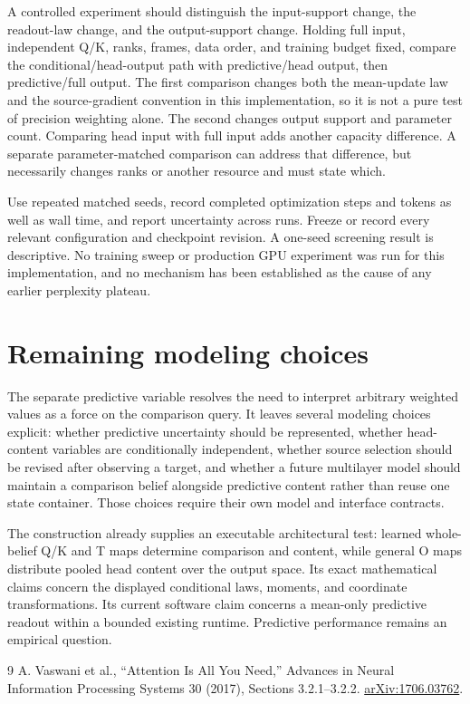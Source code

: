 \documentclass[11pt,letterpaper]{article}
\begin{document}
A controlled experiment should distinguish the input-support change, the readout-law change, and the output-support change. Holding full input, independent Q/K, ranks, frames, data order, and training budget fixed, compare the conditional/head-output path with predictive/head output, then predictive/full output. The first comparison changes both the mean-update law and the source-gradient convention in this implementation, so it is not a pure test of precision weighting alone. The second changes output support and parameter count. Comparing head input with full input adds another capacity difference. A separate parameter-matched comparison can address that difference, but necessarily changes ranks or another resource and must state which.

Use repeated matched seeds, record completed optimization steps and tokens as well as wall time, and report uncertainty across runs. Freeze or record every relevant configuration and checkpoint revision. A one-seed screening result is descriptive. No training sweep or production GPU experiment was run for this implementation, and no mechanism has been established as the cause of any earlier perplexity plateau.

\section{Remaining modeling choices}
The separate predictive variable resolves the need to interpret arbitrary weighted values as a force on the comparison query. It leaves several modeling choices explicit: whether predictive uncertainty should be represented, whether head-content variables are conditionally independent, whether source selection should be revised after observing a target, and whether a future multilayer model should maintain a comparison belief alongside predictive content rather than reuse one state container. Those choices require their own model and interface contracts.

The construction already supplies an executable architectural test: learned whole-belief Q/K and T maps determine comparison and content, while general O maps distribute pooled head content over the output space. Its exact mathematical claims concern the displayed conditional laws, moments, and coordinate transformations. Its current software claim concerns a mean-only predictive readout within a bounded existing runtime. Predictive performance remains an empirical question.

\begin{thebibliography}{9}
 A. Vaswani et al., ``Attention Is All You Need,'' Advances in Neural Information Processing Systems 30 (2017), Sections 3.2.1--3.2.2. \href{https://arxiv.org/abs/1706.03762}{arXiv:1706.03762}.
\end{thebibliography}
\end{document}
